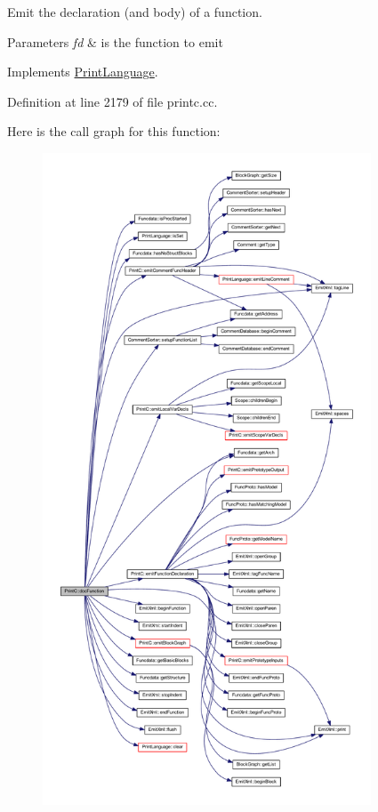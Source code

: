Emit the declaration (and body) of a function. 


\begin{DoxyParams}{Parameters}
{\em fd} & is the function to emit \\
\hline
\end{DoxyParams}


Implements \mbox{\hyperlink{class_print_language_a93ebbf4cf20c65236ffca078fd5cbc21}{Print\+Language}}.



Definition at line 2179 of file printc.\+cc.

Here is the call graph for this function\+:
\nopagebreak
\begin{figure}[H]
\begin{center}
\leavevmode
\includegraphics[height=550pt]{class_print_c_a7a3890c28908f1229f8e94e0239fe0ea_cgraph}
\end{center}
\end{figure}
\mbox{\label{class_print_c_a380029e0d567ee29b38225d6f6612b9c}} 
